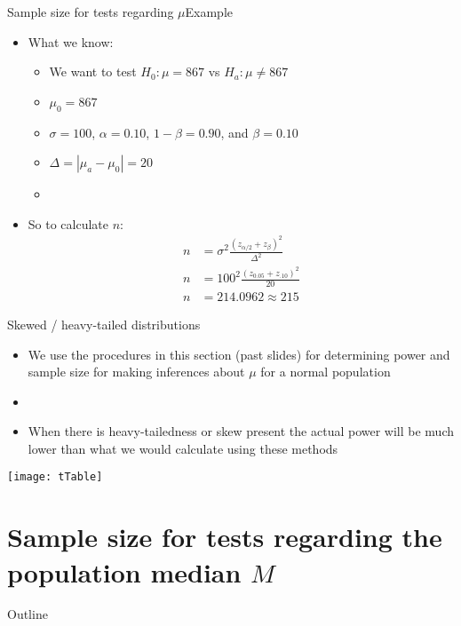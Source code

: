 \documentclass[xcolor=dvipsnames]{beamer}
\begin{document}
\begin{frame}{Sample size for tests regarding $\mu$}{Example}
	\begin{itemize}
		\item What we know:
		\begin{itemize}
			\item We want to test $H_0: \mu = 867$ vs $H_a: \mu \neq 867$
			\item $\mu_0 = 867$
			\item $\sigma = 100$, $\alpha = 0.10$, $1-\beta = 0.90$, and $\beta = 0.10$
			\item $\Delta = |\mu_a - \mu_0| = 20$
			\item[]
		\end{itemize}
		\item So to calculate $n$:
		\begin{align*}
			n &= \sigma^2\frac{(z_{\alpha/2} + z_{\beta})^2}{\Delta^2} \\
			n &= 100^2\frac{(z_{0.05} + z_{.10})^2}{20} \\
			n &= 214.0962 \approx 215
		\end{align*}
	\end{itemize}
\end{frame}

\begin{frame}{Skewed / heavy-tailed distributions}
	\begin{itemize}
		\item We use the procedures in this section (past slides) for determining power and sample size for making inferences about $\mu$ for a normal population
		\item[]
		\item When there is heavy-tailedness or skew present the actual power will be much lower than what we would calculate using these methods
	\end{itemize}
\begin{center}
	\texttt{[image: tTable]}
\end{center}
\end{frame}

\section{Sample size for tests regarding the population median $M$}
\begin{frame}{Outline}
	\tableofcontents[currentsection,subsectionstyle=show/shaded/hide]
\end{frame}
\end{document}
